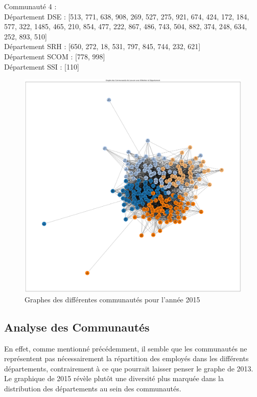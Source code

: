 \documentclass{article}
\begin{document}
\noindent
Communauté 4 : \\
Département DSE : [513, 771, 638, 908, 269, 527, 275, 921, 674, 424, 172, 184, 577, 322, 1485, 465, 210, 854, 477, 222, 867, 486, 743, 504, 882, 374, 248, 634, 252, 893, 510] \\
Département SRH : [650, 272, 18, 531, 797, 845, 744, 232, 621] \\
Département SCOM : [778, 998] \\
Département SSI : [110] \\

\begin{figure}[!h]
    \centering
    \includegraphics[width=15cm]{assets/communaute/communaute_2015.png}
    \caption{Graphes des différentes communautés pour l'année 2015}
    \label{fig:communaute_2015}
\end{figure}

\subsection{Analyse des Communautés}

En effet, comme mentionné précédemment, il semble que les communautés ne représentent pas nécessairement la répartition des employés dans les différents départements, contrairement à ce que pourrait laisser penser le graphe de 2013. Le graphique de 2015 révèle plutôt une diversité plus marquée dans la distribution des départements au sein des communautés. \\
\end{document}
